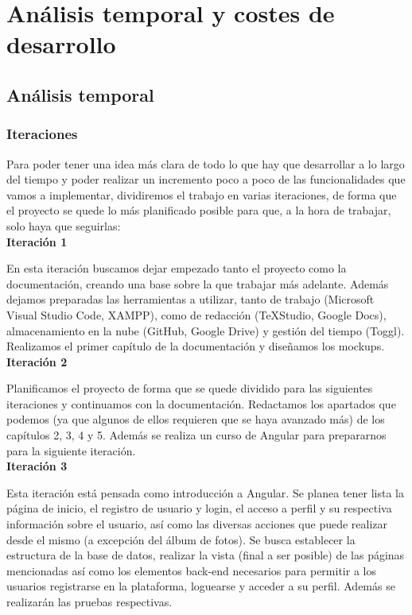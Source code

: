 \chapter{An\'alisis temporal y costes de desarrollo}\label{anatemporal}
\section{An\'alisis temporal}
\subsection{Iteraciones}

Para poder tener una idea más clara de todo lo que hay que desarrollar a lo largo del tiempo y poder realizar un incremento poco a poco de las funcionalidades que vamos a implementar, dividiremos el trabajo en varias iteraciones, de forma que el proyecto se quede lo más planificado posible para que, a la hora de trabajar, solo haya que seguirlas:\\

\textbf{Iteración 1}

En esta iteración buscamos dejar empezado tanto el proyecto como la documentación, creando una base sobre la que trabajar más adelante. Además dejamos preparadas las herramientas a utilizar, tanto de trabajo (Microsoft Visual Studio Code, XAMPP), como de redacción (TeXStudio, Google Docs), almacenamiento en la nube (GitHub, Google Drive) y gestión del tiempo (Toggl). Realizamos el primer capítulo de la documentación y diseñamos los mockups.\\

\textbf{Iteración 2}

Planificamos el proyecto de forma que se quede dividido para las siguientes iteraciones y continuamos con la documentación. Redactamos los apartados que podemos (ya que algunos de ellos requieren que se haya avanzado más) de los capítulos 2, 3, 4 y 5. Además se realiza un curso de Angular \citep{cursoangular} para prepararnos para la siguiente iteración.\\

\textbf{Iteración 3}

Esta iteración está pensada como introducción a Angular. Se planea tener lista la página de inicio, el registro de usuario y login, el acceso a perfil y su respectiva información sobre el usuario, así como las diversas acciones que puede realizar desde el mismo (a excepción del álbum de fotos). Se busca establecer la estructura de la base de datos, realizar la vista (final a ser posible) de las páginas mencionadas así como los elementos back-end necesarios para permitir a los usuarios registrarse en la plataforma, loguearse y acceder a su perfil. Además se realizarán las pruebas respectivas.\\

